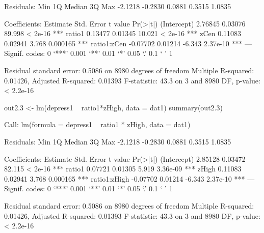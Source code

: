 \begin{Schunk}
\begin{Soutput}
Residuals:
    Min      1Q  Median      3Q     Max 
-2.1218 -0.2830  0.0881  0.3515  1.0835 

Coefficients:
            Estimate Std. Error t value Pr(>|t|)    
(Intercept)  2.76845    0.03076  89.998  < 2e-16 ***
ratio1       0.13477    0.01345  10.021  < 2e-16 ***
zCen         0.11083    0.02941   3.768 0.000165 ***
ratio1:zCen -0.07702    0.01214  -6.343 2.37e-10 ***
---
Signif. codes:  0 ‘***’ 0.001 ‘**’ 0.01 ‘*’ 0.05 ‘.’ 0.1 ‘ ’ 1

Residual standard error: 0.5086 on 8980 degrees of freedom
Multiple R-squared:  0.01426,	Adjusted R-squared:  0.01393 
F-statistic:  43.3 on 3 and 8980 DF,  p-value: < 2.2e-16
\end{Soutput}
\begin{Sinput}
 out2.3 <- lm(depress1 ~ ratio1*zHigh, data = dat1)
 summary(out2.3)
\end{Sinput}
\begin{Soutput}
Call:
lm(formula = depress1 ~ ratio1 * zHigh, data = dat1)

Residuals:
    Min      1Q  Median      3Q     Max 
-2.1218 -0.2830  0.0881  0.3515  1.0835 

Coefficients:
             Estimate Std. Error t value Pr(>|t|)    
(Intercept)   2.85128    0.03472  82.115  < 2e-16 ***
ratio1        0.07721    0.01305   5.919 3.36e-09 ***
zHigh         0.11083    0.02941   3.768 0.000165 ***
ratio1:zHigh -0.07702    0.01214  -6.343 2.37e-10 ***
---
Signif. codes:  0 ‘***’ 0.001 ‘**’ 0.01 ‘*’ 0.05 ‘.’ 0.1 ‘ ’ 1

Residual standard error: 0.5086 on 8980 degrees of freedom
Multiple R-squared:  0.01426,	Adjusted R-squared:  0.01393 
F-statistic:  43.3 on 3 and 8980 DF,  p-value: < 2.2e-16
\end{Soutput}
\end{Schunk}
